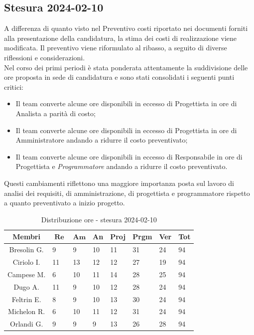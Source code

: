 \documentclass[10pt, a4paper]{article}
\begin{document}
\subsection{Stesura 2024-02-10}
A differenza di quanto visto nel Preventivo costi riportato nei documenti forniti alla presentazione della candidatura, la stima dei costi di realizzazione viene modificata. Il preventivo viene riformulato al ribasso, a seguito di diverse riflessioni e considerazioni. \\ Nel corso dei primi periodi è stata ponderata attentamente la suddivisione delle ore proposta in sede di candidatura e sono stati consolidati i seguenti punti critici:
\begin{itemize}
    \item Il team converte alcune ore disponibili in eccesso di Progettista in ore di Analista a parità di costo;
    \item Il team converte alcune ore disponibili in eccesso di Progettista in ore di Amministratore andando a ridurre il costo preventivato;
    \item Il team converte alcune ore disponibili in eccesso di Responsabile in ore di Progettista e \textit{Programmatore\pg} andando a ridurre il costo preventivato.
\end{itemize}
Questi cambiamenti riflettono una maggiore importanza posta sul lavoro di analisi dei requisiti, di amministrazione, di progettista e programmatore rispetto a quanto preventivato a inizio progetto.\\


\renewcommand{\arraystretch}{1.2}
\begin{table}[H]
\begin{tabularx}{\textwidth}{c|X|X|X|X|X|X|X}
        \textbf{Membri} & $\operatorname{\textbf{Re}}$ & $\mathrm{\textbf{Am}}$ & \textbf{An} & \textbf{Proj} & \textbf{Prgm} & \textbf{Ver} & \textbf{Tot} \\
        \hline Bresolin G. & 9 & 9 & 10 & 11 & 31 & 24 & 94 \\
        \hline Ciriolo I. & 11 & 13 & 12 & 12 & 27 & 19 & 94 \\
        \hline Campese M. & 6 & 10 & 11 & 14 & 28 & 25 & 94 \\
        \hline Dugo A.   & 11 & 9 & 10 & 12 & 28 & 24 & 94 \\
        \hline Feltrin E. & 8 & 9 & 10 & 13 & 30 & 24 & 94 \\
        \hline Michelon R. & 6 & 10 & 11 & 12 & 31 & 24 & 94 \\
        \hline Orlandi G. & 9 & 9 & 9 & 13 & 26 & 28 & 94 
    \end{tabularx}
    \caption{Distribuzione ore - stesura 2024-02-10}
    \end{table}
\end{document}
